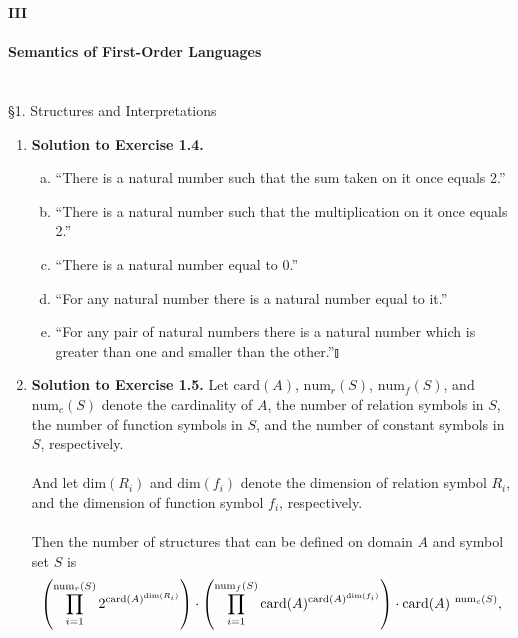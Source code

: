 {\LARGE \bfseries III \\ \\ Semantics of First-Order Languages}
\\
\\
\\
{\large \S1. Structures and Interpretations}
\begin{enumerate}[1.]
\item \textbf{Solution to Exercise 1.4.}
\begin{enumerate}[(a)]
\item ``There is a natural number such that the sum taken on it once equals 2.''
\item ``There is a natural number such that the multiplication on it once equals 2.''
\item ``There is a natural number equal to 0.''
\item ``For any natural number there is a natural number equal to it.''
\item ``For any pair of natural numbers there is a natural number which is greater than one and smaller than the other.''\nolinebreak\hfill$\talloblong$
\end{enumerate}
%
\item \textbf{Solution to Exercise 1.5.} Let $\mbox{card}(A)$, $\mbox{num}_r(S)$, $\mbox{num}_f(S)$, and $\mbox{num}_c(S)$ denote the cardinality of $A$, the number of relation symbols in $S$, the number of function symbols in $S$, and the number of constant symbols in $S$, respectively. \\
\ 
\\And let $\mbox{dim}(R_i)$ and $\mbox{dim}(f_i)$ denote the dimension of relation symbol $R_i$, and the dimension of function symbol $f_i$, respectively.\\
\ 
\\Then the number of structures that can be defined on domain $A$ and symbol set $S$ is
\[
\left( \prod\limits_{i = 1}^{ \mbox{\scriptsize num}_r(S)} 2^{ \mbox{\scriptsize card}(A)^{ \mbox{\tiny dim}(R_i)}} \right) \cdot \left( \prod\limits_{i = 1}^{ \mbox{\scriptsize num}_f(S)} \mbox{card}(A)^{ \mbox{\scriptsize card}(A)^{ \mbox{\tiny dim}(f_i) } } \right) \cdot \mbox{card}(A)^{ \mbox{ \scriptsize num}_c(S) },
\]
\end{enumerate}
